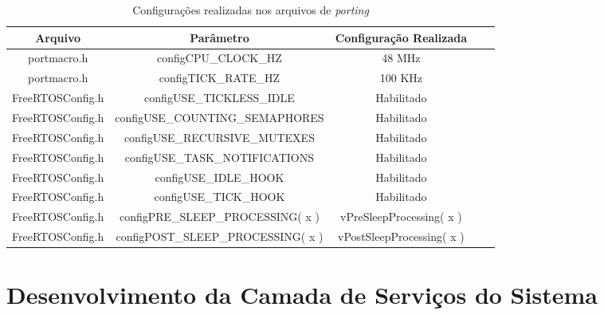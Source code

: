 \newpage
\begin{longtable}[c]{ccccl}
	\caption{Configurações realizadas nos arquivos de \textit{porting}}
	\label{port_freertos}\\
	\cline{1-3}
	\textbf{Arquivo} & \textbf{Parâmetro}                 & \textbf{Configuração Realizada} & \textbf{}            & \multicolumn{1}{c}{\textbf{}} \\ \cline{1-3}
	\endfirsthead
	\endhead
	\cline{1-3}
	\endfoot
	\endlastfoot
	portmacro.h      & configCPU\_CLOCK\_HZ               & 48 MHz                          &                      &                               \\
	portmacro.h      & configTICK\_RATE\_HZ               & 100 KHz                         &                      &                               \\
	FreeRTOSConfig.h & configUSE\_TICKLESS\_IDLE          & Habilitado                      &                      &                               \\
	FreeRTOSConfig.h & configUSE\_COUNTING\_SEMAPHORES    & Habilitado                      &                      &                               \\
	FreeRTOSConfig.h & configUSE\_RECURSIVE\_MUTEXES      & Habilitado                      &                      &                               \\
	FreeRTOSConfig.h & configUSE\_TASK\_NOTIFICATIONS     & Habilitado                      &                      &                               \\
	FreeRTOSConfig.h & configUSE\_IDLE\_HOOK              & Habilitado                      &                      &                               \\
	FreeRTOSConfig.h & configUSE\_TICK\_HOOK              & Habilitado                      &                      &                               \\
	FreeRTOSConfig.h & configPRE\_SLEEP\_PROCESSING( x )  & vPreSleepProcessing( x )        & \multicolumn{1}{l}{} &                               \\
	FreeRTOSConfig.h & configPOST\_SLEEP\_PROCESSING( x ) & vPostSleepProcessing( x )       & \multicolumn{1}{l}{} &                               \\ \cline{1-3}
\end{longtable}


\section{Desenvolvimento da Camada de Serviços do Sistema}


